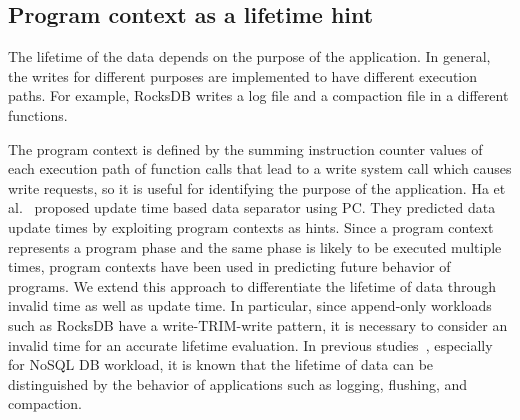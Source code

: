 
\subsection{Program context as a lifetime hint}
The lifetime of the data depends on the purpose of the application. 
In general, the writes for different purposes are implemented to have different execution paths.
For example, RocksDB writes a log file and a compaction file in a different functions.

The program context is defined by the summing instruction counter values 
of each execution path of function calls that lead to a write system call which causes write requests,
so it is useful for identifying the purpose of the application. 
Ha et al.~\cite{PCHa} proposed update time based data separator using PC. 
They predicted data update times by exploiting program contexts as hints. 
Since a program context represents a program phase and the same phase is likely to be executed multiple times, 
program contexts have been used in predicting future behavior of programs. 
We extend this approach to differentiate the lifetime of data through invalid time as well as update time. 
In particular, since append-only workloads such as RocksDB have a write-TRIM-write pattern, 
it is necessary to consider an invalid time for an accurate lifetime evaluation.
In previous studies~\cite{MultiStream}, especially for NoSQL DB workload, 
it is known that the lifetime of data can be distinguished by the behavior of applications such as logging, 
flushing, and compaction. 

